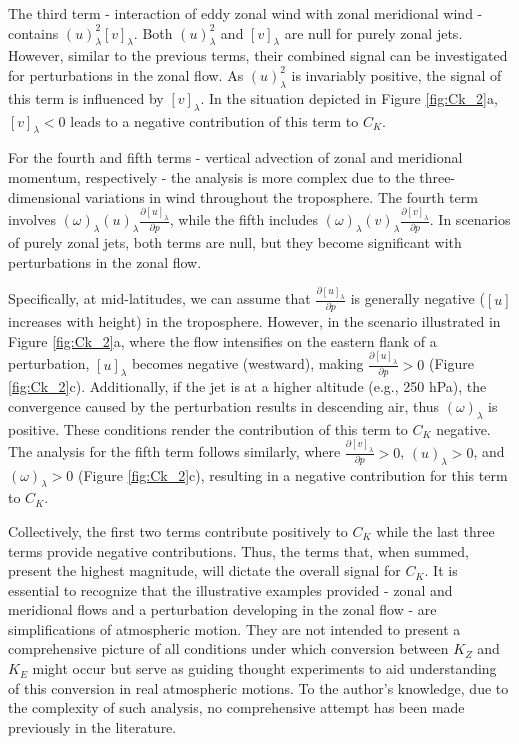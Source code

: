 The third term - interaction of eddy zonal wind with zonal meridional wind - contains \( (u)^{2}_\lambda [v]_\lambda \). Both \( (u)^{2}_\lambda \) and \( [v]_\lambda \) are null for purely zonal jets. However, similar to the previous terms, their combined signal can be investigated for perturbations in the zonal flow. As \( (u)^{2}_\lambda \) is invariably positive, the signal of this term is influenced by \( [v]_\lambda \). In the situation depicted in Figure \ref{fig:Ck_2}a, \( [v]_\lambda < 0 \) leads to a negative contribution of this term to \( C_K \).

For the fourth and fifth terms - vertical advection of zonal and meridional momentum, respectively - the analysis is more complex due to the three-dimensional variations in wind throughout the troposphere. The fourth term involves \( (\omega)_\lambda (u)_\lambda \frac{\partial [u]_\lambda}{\partial p} \), while the fifth includes \( (\omega)_\lambda (v)_\lambda \frac{\partial [v]_\lambda}{\partial p} \). In scenarios of purely zonal jets, both terms are null, but they become significant with perturbations in the zonal flow.

Specifically, at mid-latitudes, we can assume that \( \frac{\partial [u]_\lambda}{\partial p} \) is generally negative (\([u]\) increases with height) in the troposphere. However, in the scenario illustrated in Figure \ref{fig:Ck_2}a, where the flow intensifies on the eastern flank of a perturbation, \( [u]_\lambda \) becomes negative (westward), making \( \frac{\partial [u]_\lambda}{\partial p} > 0 \) (Figure \ref{fig:Ck_2}c). Additionally, if the jet is at a higher altitude (e.g., 250 hPa), the convergence caused by the perturbation results in descending air, thus \( (\omega)_\lambda \) is positive. These conditions render the contribution of this term to \( C_K \) negative. The analysis for the fifth term follows similarly, where \( \frac{\partial [v]_\lambda}{\partial p} > 0 \), \( (u)_\lambda > 0 \), and \( (\omega)_\lambda > 0 \) (Figure \ref{fig:Ck_2}c), resulting in a negative contribution for this term to \( C_K \).

Collectively, the first two terms contribute positively to \( C_K \) while the last three terms provide negative contributions. Thus, the terms that, when summed, present the highest magnitude, will dictate the overall signal for \( C_K \). It is essential to recognize that the illustrative examples provided - zonal and meridional flows and a perturbation developing in the zonal flow - are simplifications of atmospheric motion. They are not intended to present a comprehensive picture of all conditions under which conversion between \( K_Z \) and \( K_E \) might occur but serve as guiding thought experiments to aid understanding of this conversion in real atmospheric motions. To the author's knowledge, due to the complexity of such analysis, no comprehensive attempt has been made previously in the literature.


